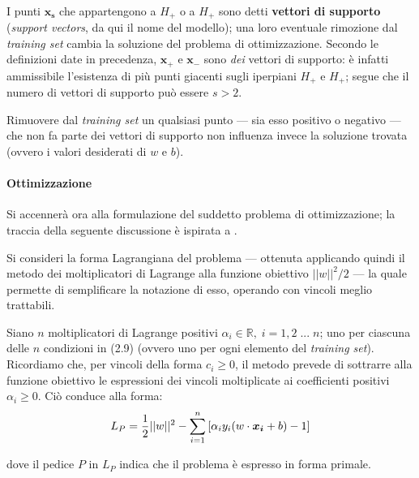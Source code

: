 \paragraph{}
I punti $\boldsymbol{x_s}$ che appartengono a $H_+$ o a $H_+$ sono detti \textbf{vettori di supporto} (\textit{support vectors}, da qui il nome del modello); una loro eventuale rimozione dal \textit{training set} cambia la soluzione del problema di ottimizzazione.
Secondo le definizioni date in precedenza, $\boldsymbol{x_+}$ e $\boldsymbol{x_-}$ sono \textit{dei} vettori di supporto: è infatti ammissibile l'esistenza di più punti giacenti sugli iperpiani $H_+$ e $H_+$; segue che il numero di vettori di supporto può essere $s > 2$. 

Rimuovere dal \textit{training set} un qualsiasi punto --- sia esso positivo o negativo --- che non fa parte dei vettori di supporto non influenza invece la soluzione trovata (ovvero i valori desiderati di $w$ e $b$).

\paragraph{Ottimizzazione}
Si accennerà ora alla formulazione del suddetto problema di ottimizzazione; la traccia della seguente discussione è ispirata a \cite{tutorial}.

Si consideri la forma Lagrangiana del problema --- ottenuta applicando quindi il metodo dei moltiplicatori di Lagrange alla funzione obiettivo $||w||^2 / 2$ --- la quale permette di semplificare la notazione di esso, operando con vincoli meglio trattabili.

Siano $n$ moltiplicatori di Lagrange positivi $\alpha_i \in \mathbb{R}, \; i = 1, 2\; ... \;n $; uno per ciascuna delle $n$ condizioni in (2.9) (ovvero uno per ogni elemento del \textit{training set}).
Ricordiamo che, per vincoli della forma $c_i \geq 0$, il metodo prevede di sottrarre alla funzione obiettivo le espressioni dei vincoli moltiplicate ai coefficienti positivi $\alpha_i \geq 0$.
Ciò conduce alla forma:
\begin{equation}
\vspace{2mm}
 	L_P = \frac{1}{2}||w||^2 - \sum\limits_{i = 1}^{n} {\lbrack \alpha_i y_i (w \cdot \boldsymbol{x_i} + b) - 1 \rbrack}
\vspace{2mm}
\end{equation}

dove il pedice $P$ in $L_P$ indica che il problema è espresso in forma primale. 
